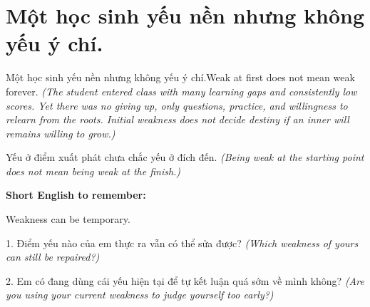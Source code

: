 \section{Một học sinh yếu nền nhưng không yếu ý chí.}
\begin{truyen}{Một học sinh yếu nền nhưng không yếu ý chí.}{Weak at first does not mean weak forever.}
\textit{(The student entered class with many learning gaps and consistently low scores. Yet there was no giving up, only questions, practice, and willingness to relearn from the roots. Initial weakness does not decide destiny if an inner will remains willing to grow.)}
\end{truyen}
\begin{baihoc}
Yếu ở điểm xuất phát chưa chắc yếu ở đích đến.
\textit{(Being weak at the starting point does not mean being weak at the finish.)}
\end{baihoc}
\begin{ghinhoanh}
\textbf{Short English to remember:}

Weakness can be temporary.
\end{ghinhoanh}
\begin{tuhocnhanh}
1. Điểm yếu nào của em thực ra vẫn có thể sửa được? \textit{(Which weakness of yours can still be repaired?)}

2. Em có đang dùng cái yếu hiện tại để tự kết luận quá sớm về mình không? \textit{(Are you using your current weakness to judge yourself too early?)}
\end{tuhocnhanh}
\ngancach

